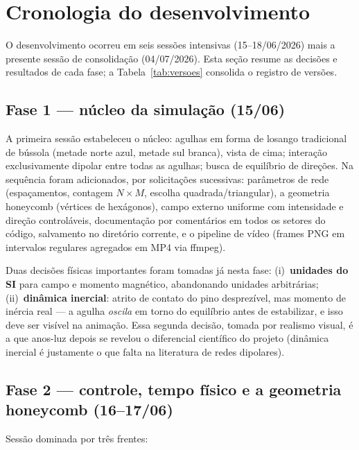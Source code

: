\documentclass[11pt,a4paper]{article}
\begin{document}
\section{Cronologia do desenvolvimento}

O desenvolvimento ocorreu em seis sessões intensivas (15--18/06/2026)
mais a presente sessão de consolidação (04/07/2026). Esta seção resume
as decisões e resultados de cada fase; a
Tabela~\ref{tab:versoes} consolida o registro de versões.

\subsection{Fase 1 --- núcleo da simulação (15/06)}

A primeira sessão estabeleceu o núcleo: agulhas em forma de losango
tradicional de bússola (metade norte azul, metade sul branca), vista de
cima; interação exclusivamente dipolar entre todas as agulhas; busca de
equilíbrio de direções. Na sequência foram adicionados, por solicitações
sucessivas: parâmetros de rede (espaçamentos, contagem $N \times M$,
escolha quadrada/triangular), a geometria honeycomb (vértices de
hexágonos), campo externo uniforme com intensidade e direção
controláveis, documentação por comentários em todos os setores do
código, salvamento no diretório corrente, e o pipeline de vídeo
(frames PNG em intervalos regulares agregados em MP4 via ffmpeg).

Duas decisões físicas importantes foram tomadas já nesta fase:
(i)~\textbf{unidades do SI} para campo e momento magnético, abandonando
unidades arbitrárias; (ii)~\textbf{dinâmica inercial}: atrito de contato
do pino desprezível, mas momento de inércia real --- a agulha
\emph{oscila} em torno do equilíbrio antes de estabilizar, e isso deve
ser visível na animação. Essa segunda decisão, tomada por realismo
visual, é a que anos-luz depois se revelou o diferencial científico do
projeto (dinâmica inercial é justamente o que falta na literatura de
redes dipolares).

\subsection{Fase 2 --- controle, tempo físico e a geometria honeycomb
(16--17/06)}

Sessão dominada por três frentes:
\end{document}
